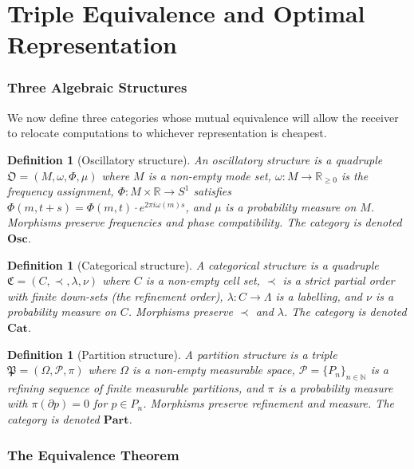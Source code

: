 \documentclass[twocolumn,a4paper]{article}
\newtheorem{definition}[theorem]{Definition}
\newcommand{\Real}{\mathbb{R}}
\newcommand{\Natural}{\mathbb{N}}
\newcommand{\OOsc}{\mathfrak{O}}
\newcommand{\CCat}{\mathfrak{C}}
\newcommand{\PPart}{\mathfrak{P}}
\begin{document}
\part{Triple Equivalence and Optimal Representation}

\section{Three Algebraic Structures}
\label{sec:three-structures}

We now define three categories whose mutual equivalence will allow the receiver to relocate computations to whichever representation is cheapest.

\begin{definition}[Oscillatory structure]
\label{def:osc}
An \emph{oscillatory structure} is a quadruple $\OOsc=(M,\omega,\Phi,\mu)$ where $M$ is a non-empty mode set, $\omega\colon M\to\Real_{\geq 0}$ is the frequency assignment, $\Phi\colon M\times\Real\to S^{1}$ satisfies $\Phi(m,t+s)=\Phi(m,t)\cdot e^{2\pi i\omega(m)s}$, and $\mu$ is a probability measure on $M$. Morphisms preserve frequencies and phase compatibility. The category is denoted $\mathbf{Osc}$.
\end{definition}

\begin{definition}[Categorical structure]
\label{def:cat-struct}
A \emph{categorical structure} is a quadruple $\CCat=(C,\prec,\lambda,\nu)$ where $C$ is a non-empty cell set, $\prec$ is a strict partial order with finite down-sets (the refinement order), $\lambda\colon C\to\Lambda$ is a labelling, and $\nu$ is a probability measure on $C$. Morphisms preserve $\prec$ and $\lambda$. The category is denoted $\mathbf{Cat}$.
\end{definition}

\begin{definition}[Partition structure]
\label{def:part-struct}
A \emph{partition structure} is a triple $\PPart=(\Omega,\mathscr{P},\pi)$ where $\Omega$ is a non-empty measurable space, $\mathscr{P}=\{P_{n}\}_{n\in\Natural}$ is a refining sequence of finite measurable partitions, and $\pi$ is a probability measure with $\pi(\partial p)=0$ for $p\in P_{n}$. Morphisms preserve refinement and measure. The category is denoted $\mathbf{Part}$.
\end{definition}

\section{The Equivalence Theorem}
\label{sec:equivalence}
\end{document}
